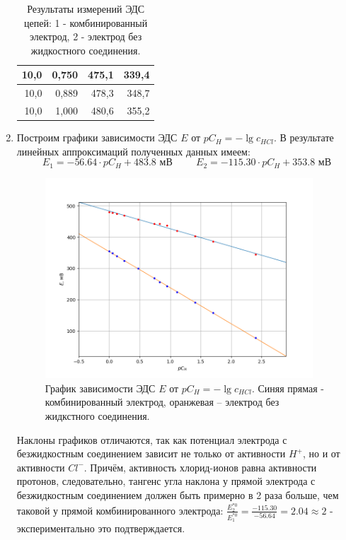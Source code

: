 \documentclass[a4paper,12pt]{article}
\begin{document}
\begin{enumerate}
\begin{table}[h!]
\begin{tabular}{|r|r|r|r|}
10,0                                        & 0,750                & 475,1                                  & 339,4             \\ \hline
10,0                                        & 0,889               & 478,3                                  & 348,7             \\ \hline
10,0                                        & 1,000                   & 480,6                                  & 355,2             \\ \hline
\end{tabular}
\caption{Результаты измерений ЭДС цепей: 1 - комбинированный электрод, 2 - электрод без жидкостного соединения.}
\label{tab:my-table}
\end{table}

\item Построим графики зависимости ЭДС $E$ от $pC_{H}=-\lg c_{HCl}$. В результате линейных аппроксимаций полученных данных имеем:
\[
E_{1} = -56.64\cdot pC_{H}  + 483.8 \text{ мВ}  \hspace{1cm} E_{2} = -115.30\cdot pC_{H}  + 353.8 \text{ мВ}
\]

\begin{figure}[h!]
    \centering
    \includegraphics[width=10cm]{Figure_2.png}
    \caption{График зависимости ЭДС $E$ от $pC_{H}=-\lg c_{HCl}$. Синяя прямая - комбинированный электрод, оранжевая – электрод без жидкстного соединения.
}
    \label{fig:vac}
\end{figure}

Наклоны графиков отличаются, так как потенциал электрода с безжидкостным соединением зависит не только от активности $H^{+}$, но и от активности $Cl^{-}$. Причём, активность хлорид-ионов равна активности протонов, следовательно, тангенс угла наклона у прямой электрода с безжидкостным соединением должен быть примерно в 2 раза больше, чем таковой у прямой комбинированного электрода: $\frac{E_{2}^{*0}}{E_{1}^{*0}} = \frac{-115.30}{-56.64} = 2.04 \approx 2$ - экспериментально это подтверждается.


\end{enumerate}
\end{document}
